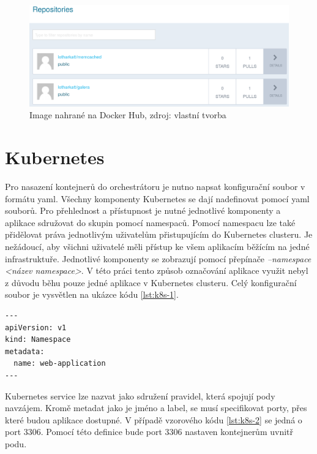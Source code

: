 \begin{figure}[H]
\begin{centering}
\includegraphics[width=1.0\textwidth]{img/docker_repository}
\par\end{centering}
\caption{Image nahrané na Docker Hub, zdroj: vlastní tvorba \label{fig:docker_repository}}
\end{figure}


\section{Kubernetes}
Pro nasazení kontejnerů do orchestrátoru je nutno napsat konfigurační soubor v formátu yaml. Všechny komponenty Kubernetes se dají nadefinovat pomocí yaml souborů. Pro přehlednost a přístupnost je nutné jednotlivé komponenty a aplikace sdružovat do skupin pomocí namespaců. Pomocí namespacu lze také přidělovat práva jednotlivým uživatelům přistupujícím do Kubernetes clusteru. Je nežádoucí, aby všichni uživatelé měli přístup ke všem aplikacím běžícím na jedné infrastruktuře. Jednotlivé komponenty se zobrazují pomocí přepínače \textit{--namespace <název namespace>}. V této práci tento způsob označování aplikace využit nebyl z důvodu běhu pouze jedné aplikace v Kubernetes clusteru. Celý konfigurační soubor je vysvětlen na ukázce kódu \ref{lst:k8s-1}.

\begin{lstlisting}[caption={Ukázka konfigurace Kubernetes  komponent, část 1},label= {lst:k8s-1}]
---
apiVersion: v1
kind: Namespace
metadata:
  name: web-application
---
\end{lstlisting}

Kubernetes service lze nazvat jako sdružení pravidel, která spojují pody navzájem. Kromě metadat jako je jméno a label, se musí specifikovat porty, přes které budou aplikace dostupné. V případě vzorového kódu \ref{lst:k8s-2} se jedná o port 3306. Pomocí této definice bude port 3306 nastaven kontejnerům uvnitř podu. 

